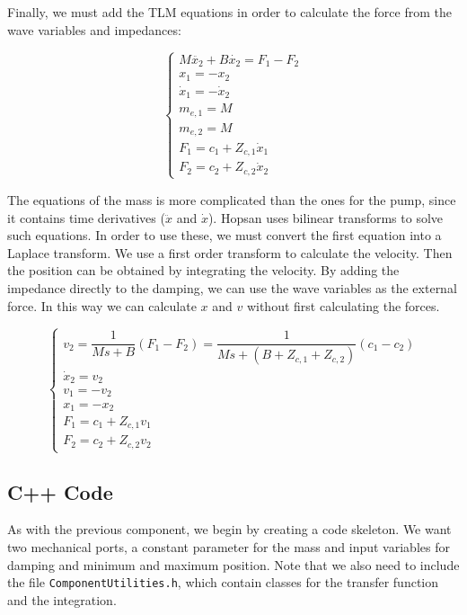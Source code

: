 \documentclass[a4paper,pdftex]{article}
\begin{document}
\noindent Finally, we must add the TLM equations in order to calculate the force from the wave variables and impedances:

\begin{equation*}
\begin{cases}
M\ddot{x_{2}} + B\dot{x_{2}} = F_{1} - F_{2}\\
x_{1} = -x_{2} \\
\dot{x}_{1} = -\dot{x}_{2} \\
m_{e,1} = M \\
m_{e,2} = M \\
F_{1} = c_{1} + Z_{c,1}\dot{x}_{1} \\
F_{2} = c_{2} + Z_{c,2}\dot{x}_{2} 
\end{cases}
\end{equation*}

\noindent The equations of the mass is more complicated than the ones for the pump, since it contains time derivatives ($\ddot{x}$ and $\dot{x}$). Hopsan uses bilinear transforms to solve such equations. In order to use these, we must convert the first equation into a Laplace transform. We use a first order transform to calculate the velocity. Then the position can be obtained by integrating the velocity. By adding the impedance directly to the damping, we can use the wave variables as the external force. In this way we can calculate $x$ and $v$ without first calculating the forces. 

\begin{equation*}
\begin{cases}
v_{2} = \dfrac{1}{M s + B}(F_{1}-F_{2}) = \dfrac{1}{M s + (B+Z_{c,1}+Z_{c,2})}(c_{1}-c_{2}) \\
\dot{x}_{2} = v_{2} \\
v_{1} = -v_{2} \\
x_{1} = -x_{2} \\
F_{1} = c_{1} + Z_{c,1}v_{1} \\
F_{2} = c_{2} + Z_{c,2}v_{2} 
\end{cases}
\end{equation*}

\subsection*{C++ Code}
As with the previous component, we begin by creating a code skeleton. We want two mechanical ports, a constant parameter for the mass and input variables for damping and minimum and maximum position. Note that we also need to include the file \texttt{ComponentUtilities.h}, which contain classes for the transfer function and the integration.
 	
\end{document}
